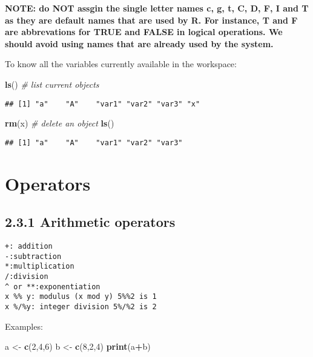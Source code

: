 \documentclass[]{book}
\newenvironment{Shaded}{\begin{snugshade}}{\end{snugshade}}
\newcommand{\KeywordTok}[1]{\textcolor[rgb]{0.13,0.29,0.53}{\textbf{#1}}}
\newcommand{\DecValTok}[1]{\textcolor[rgb]{0.00,0.00,0.81}{#1}}
\newcommand{\StringTok}[1]{\textcolor[rgb]{0.31,0.60,0.02}{#1}}
\newcommand{\CommentTok}[1]{\textcolor[rgb]{0.56,0.35,0.01}{\textit{#1}}}
\newcommand{\OperatorTok}[1]{\textcolor[rgb]{0.81,0.36,0.00}{\textbf{#1}}}
\newcommand{\NormalTok}[1]{#1}
\theoremstyle{definition}
\theoremstyle{definition}
\theoremstyle{definition}
\theoremstyle{remark}
\begin{document}
\textbf{NOTE: do NOT assgin the single letter names c, g, t, C, D, F, I
and T as they are default names that are used by R. For instance, T and
F are abbrevations for TRUE and FALSE in logical operations. We should
avoid using names that are already used by the system.}

To know all the variables currently available in the workspace:

\begin{Shaded}
\begin{Highlighting}[]
\KeywordTok{ls}\NormalTok{()  }\CommentTok{# list current objects}
\end{Highlighting}
\end{Shaded}

\begin{verbatim}
## [1] "a"    "A"    "var1" "var2" "var3" "x"
\end{verbatim}

\begin{Shaded}
\begin{Highlighting}[]
\KeywordTok{rm}\NormalTok{(x) }\CommentTok{# delete an object}
\KeywordTok{ls}\NormalTok{()}
\end{Highlighting}
\end{Shaded}

\begin{verbatim}
## [1] "a"    "A"    "var1" "var2" "var3"
\end{verbatim}

\section{Operators}\label{operators}

\subsection{2.3.1 Arithmetic operators}\label{arithmetic-operators}

\begin{verbatim}
+: addition
-:subtraction
*:multiplication
/:division
^ or **:exponentiation
x %% y: modulus (x mod y) 5%%2 is 1
x %/%y: integer division 5%/%2 is 2
\end{verbatim}

Examples:

\begin{Shaded}
\begin{Highlighting}[]
\NormalTok{a <-}\StringTok{ }\KeywordTok{c}\NormalTok{(}\DecValTok{2}\NormalTok{,}\DecValTok{4}\NormalTok{,}\DecValTok{6}\NormalTok{)}
\NormalTok{b <-}\StringTok{ }\KeywordTok{c}\NormalTok{(}\DecValTok{8}\NormalTok{,}\DecValTok{2}\NormalTok{,}\DecValTok{4}\NormalTok{)}
\KeywordTok{print}\NormalTok{(a}\OperatorTok{+}\NormalTok{b)}
\end{Highlighting}
\end{Shaded}
\end{document}
